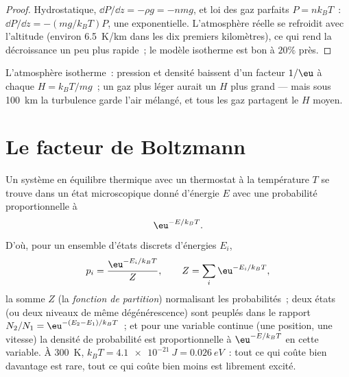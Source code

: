 \begin{proof}
Hydrostatique, $\dd P/\dd z = -\rho g = -nmg$, et loi des gaz parfaits $P
= nk_BT$~: $\dd P/\dd z = -(mg/k_BT)P$, une exponentielle. L'atmosphère
réelle se refroidit avec l'altitude (environ \qty{6.5}{K/km} dans les dix premiers
kilomètres), ce qui rend la décroissance un peu plus rapide~; le modèle
isotherme est bon à $20\%$ près.
\end{proof}

\begin{omfigure}

{\small L'atmosphère isotherme~: pression et densité baissent d'un facteur $1/\eu$
à chaque  $H = k_BT/mg$~; un gaz plus léger aurait un $H$ plus grand
--- mais sous \qty{100}{km} la turbulence garde l'air mélangé, et tous les
gaz partagent le $H$ moyen.}
\end{omfigure}

\section{Le facteur de Boltzmann}

\begin{theorem}\label{thm:b2:boltzmann-factor:factor}
Un système en équilibre thermique avec un thermostat à la température
$T$ se trouve dans un état microscopique donné d'énergie $E$ avec une
probabilité proportionnelle à
\[
\eu^{-E/k_BT} .
\]
D'où, pour un ensemble d'états discrets d'énergies $E_i$,
\[
p_i = \frac{\eu^{-E_i/k_BT}}{Z}, \qquad Z = \sum_i\eu^{-E_i/k_BT} ,
\]
la somme $Z$ (la \emph{fonction de partition})
normalisant les probabilités~; deux états (ou deux niveaux de même
dégénérescence) sont peuplés dans le rapport $N_2/N_1 = \eu^{-(E_2 - E_1)/k_BT}$~;
et pour une variable continue (une position, une vitesse) la densité de
probabilité est proportionnelle à $\eu^{-E/k_BT}$ en cette variable. À
\qty{300}{K}, $k_BT = \qty{4.1e-21}{J} = \qty{0.026}{eV}$~: tout ce qui
coûte bien davantage est rare, tout ce qui coûte bien moins est
librement excité.
\end{theorem}

